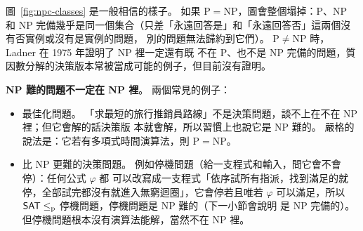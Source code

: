 \begin{center}\begin{minipage}{\linewidth}\centering
{}
\label{fig:npc-classes}
\end{minipage}\end{center}

圖~\ref{fig:npc-classes} 是一般相信的樣子。 如果 $\mathrm{P} = \mathrm{NP}$，圖會整個塌掉：P、NP 和
NP 完備幾乎是同一個集合（只差「永遠回答是」和「永遠回答否」這兩個沒有否實例或沒有是實例的問題，
別的問題無法歸約到它們）。 $\mathrm{P} \ne \mathrm{NP}$ 時，Ladner 在 1975 年證明了 NP 裡一定還有既
不在 P、也不是 NP 完備的問題，質因數分解的決策版本常被當成可能的例子，但目前沒有證明。

\textbf{NP 難的問題不一定在 NP 裡}。 兩個常見的例子：
\begin{itemize}
\item 最佳化問題。 「求最短的旅行推銷員路線」不是決策問題，談不上在不在 NP 裡；但它會解的話決策版
本就會解，所以習慣上也說它是 NP 難的。 嚴格的說法是：它若有多項式時間演算法，則
$\mathrm{P} = \mathrm{NP}$。
\item 比 NP 更難的決策問題。 例如停機問題（給一支程式和輸入，問它會不會停）：任何公式 $\varphi$ 都
可以改寫成一支程式「依序試所有指派，找到滿足的就停，全部試完都沒有就進入無窮迴圈」，它會停若且唯若
$\varphi$ 可以滿足，所以 $\textsf{SAT} \le_{\mathrm{p}}$ 停機問題，停機問題是 NP 難的（下一小節會說明
 是 NP 完備的）。 但停機問題根本沒有演算法能解，當然不在 NP 裡。
\end{itemize}

